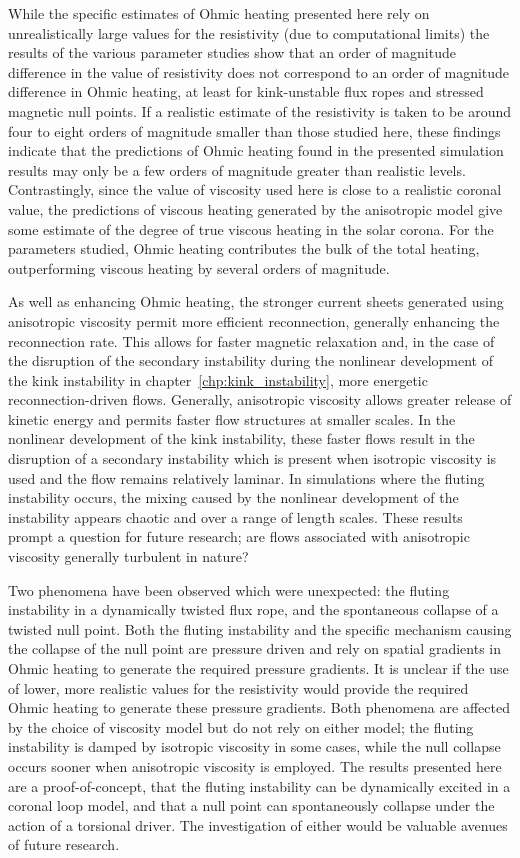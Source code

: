 While the specific estimates of Ohmic heating presented here rely on unrealistically large values for the resistivity (due to computational limits) the results of the various parameter studies show that an order of magnitude difference in the value of resistivity does not correspond to an order of magnitude difference in Ohmic heating, at least for kink-unstable flux ropes and stressed magnetic null points. If a realistic estimate of the resistivity is taken to be around four to eight orders of magnitude smaller than those studied here, these findings indicate that the predictions of Ohmic heating found in the presented simulation results may only be a few orders of magnitude greater than realistic levels. Contrastingly, since the value of viscosity used here is close to a realistic coronal value, the predictions of viscous heating generated by the anisotropic model give some estimate of the degree of true viscous heating in the solar corona. For the parameters studied, Ohmic heating contributes the bulk of the total heating, outperforming viscous heating by several orders of magnitude. 

As well as enhancing Ohmic heating, the stronger current sheets generated using anisotropic viscosity permit more efficient reconnection, generally enhancing the reconnection rate. This allows for faster magnetic relaxation and, in the case of the disruption of the secondary instability during the nonlinear development of the kink instability in chapter~\ref{chp:kink_instability}, more energetic reconnection-driven flows. Generally, anisotropic viscosity allows greater release of kinetic energy and permits faster flow structures at smaller scales. In the nonlinear development of the kink instability, these faster flows result in the disruption of a secondary instability which is present when isotropic viscosity is used and the flow remains relatively laminar. In simulations where the fluting instability occurs, the mixing caused by the nonlinear development of the instability appears chaotic and over a range of length scales. These results prompt a question for future research; are flows associated with anisotropic viscosity generally turbulent in nature? 

Two phenomena have been observed which were unexpected: the fluting instability in a dynamically twisted flux rope, and the spontaneous collapse of a twisted null point. Both the fluting instability and the specific mechanism causing the collapse of the null point are pressure driven and rely on spatial gradients in Ohmic heating to generate the required pressure gradients. It is unclear if the use of lower, more realistic values for the resistivity would provide the required Ohmic heating to generate these pressure gradients. Both phenomena are affected by the choice of viscosity model but do not rely on either model; the fluting instability is damped by isotropic viscosity in some cases, while the null collapse occurs sooner when anisotropic viscosity is employed. The results presented here are a proof-of-concept, that the fluting instability can be dynamically excited in a coronal loop model, and that a null point can spontaneously collapse under the action of a torsional driver. The investigation of either would be valuable avenues of future research.

